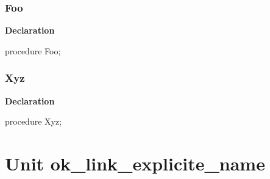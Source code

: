 \documentclass{report}
\newif\ifpdf
\begin{document}
\subsection*{Foo}
\fi
\label{ok_link_class_unit_level-Foo}
\begin{list}{}{
\setlength{\itemindent}{0cm}
\setlength{\listparindent}{0cm}
\setlength{\leftmargin}{\evensidemargin}
\addtolength{\leftmargin}{\tmplength}
\settowidth{\labelsep}{X}
\addtolength{\leftmargin}{\labelsep}
\setlength{\labelwidth}{\tmplength}
}
\item[\textbf{Declaration}\hfill]
\ifpdf
\begin{flushleft}
\fi
\begin{ttfamily}
procedure Foo;\end{ttfamily}

\ifpdf
\end{flushleft}
\fi

\end{list}
\ifpdf
\subsection*{\large{\textbf{Xyz}}\normalsize\hspace{1ex}\hrulefill}
\else
\subsection*{Xyz}
\fi
\label{ok_link_class_unit_level-Xyz}
\begin{list}{}{
\setlength{\itemindent}{0cm}
\setlength{\listparindent}{0cm}
\setlength{\leftmargin}{\evensidemargin}
\addtolength{\leftmargin}{\tmplength}
\settowidth{\labelsep}{X}
\addtolength{\leftmargin}{\labelsep}
\setlength{\labelwidth}{\tmplength}
}
\item[\textbf{Declaration}\hfill]
\ifpdf
\begin{flushleft}
\fi
\begin{ttfamily}
procedure Xyz;\end{ttfamily}

\ifpdf
\end{flushleft}
\fi

\end{list}
\chapter{Unit ok{\_}link{\_}explicite{\_}name}
\label{ok_link_explicite_name}
\end{document}
